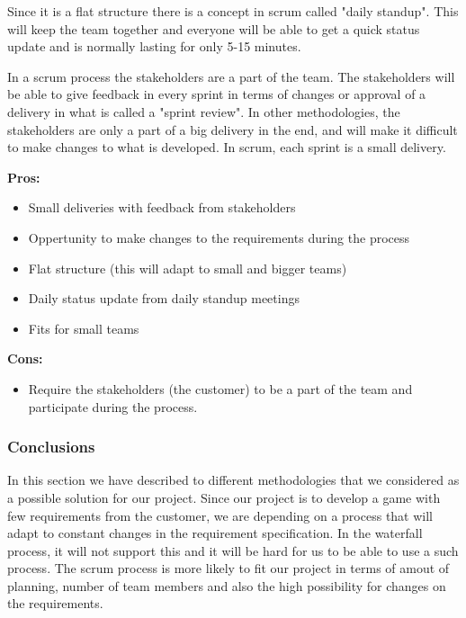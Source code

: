 Since it is a flat structure there is a concept in scrum called "daily standup". This will keep
the team together and everyone will be able to get a quick status update and is normally lasting
for only 5-15 minutes. 

In a scrum process the stakeholders are a part of the team. The stakeholders will be able to give
feedback in every sprint in terms of changes or approval of a delivery in what is called a "sprint review".
In other methodologies, the stakeholders are only a part of a big delivery in the end, and will 
make it difficult to make changes to what is developed. In scrum, each sprint is a small delivery.

{\bf Pros: }
\begin{itemize}
	\item Small deliveries with feedback from stakeholders
	\item Oppertunity to make changes to the requirements during the process
	\item Flat structure (this will adapt to small and bigger teams)
	\item Daily status update from daily standup meetings
	\item Fits for small teams
\end{itemize}

{\bf Cons: }
\begin{itemize}
	\item Require the stakeholders (the customer) to be a part of the team and participate during the process.
\end{itemize}

\subsubsection{Conclusions}
In this section we have described to different methodologies that we considered as a possible solution 
for our project. Since our project is to develop a game with few requirements from the customer, we are
depending on a process that will adapt to constant changes in the requirement specification. 
In the waterfall process, it will not support this and it will be hard for us to be able to use a
such process. The scrum process is more likely to fit our project in terms of amout of planning, 
number of team members and also the high possibility for changes on the requirements.



